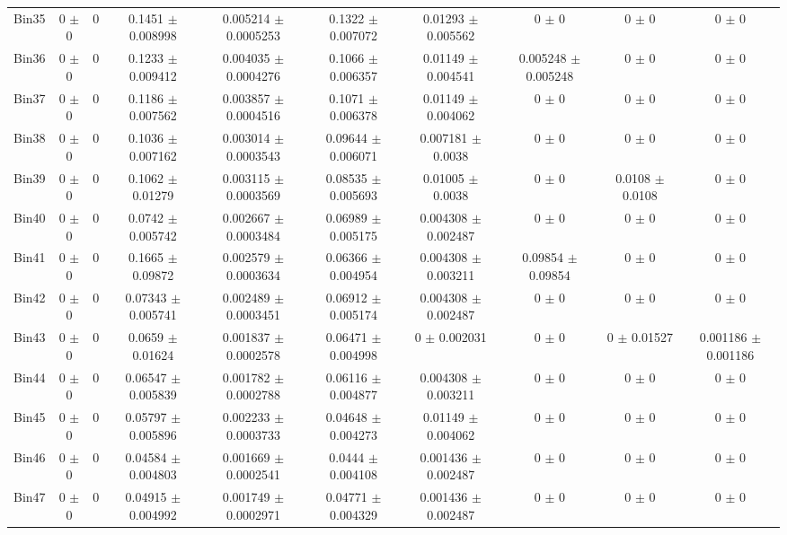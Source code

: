 \begin{tabular}{@{\extracolsep{4pt}}lccccccccc@{}}
     Bin35 & 0 $\pm$ 0 & 0 & 0.1451 $\pm$ 0.008998 & 0.005214 $\pm$ 0.0005253 & 0.1322 $\pm$ 0.007072 & 0.01293 $\pm$ 0.005562 & 0 $\pm$ 0 & 0 $\pm$ 0 & 0 $\pm$ 0 \\ 
     Bin36 & 0 $\pm$ 0 & 0 & 0.1233 $\pm$ 0.009412 & 0.004035 $\pm$ 0.0004276 & 0.1066 $\pm$ 0.006357 & 0.01149 $\pm$ 0.004541 & 0.005248 $\pm$ 0.005248 & 0 $\pm$ 0 & 0 $\pm$ 0 \\ 
     Bin37 & 0 $\pm$ 0 & 0 & 0.1186 $\pm$ 0.007562 & 0.003857 $\pm$ 0.0004516 & 0.1071 $\pm$ 0.006378 & 0.01149 $\pm$ 0.004062 & 0 $\pm$ 0 & 0 $\pm$ 0 & 0 $\pm$ 0 \\ 
     Bin38 & 0 $\pm$ 0 & 0 & 0.1036 $\pm$ 0.007162 & 0.003014 $\pm$ 0.0003543 & 0.09644 $\pm$ 0.006071 & 0.007181 $\pm$ 0.0038 & 0 $\pm$ 0 & 0 $\pm$ 0 & 0 $\pm$ 0 \\ 
     Bin39 & 0 $\pm$ 0 & 0 & 0.1062 $\pm$ 0.01279 & 0.003115 $\pm$ 0.0003569 & 0.08535 $\pm$ 0.005693 & 0.01005 $\pm$ 0.0038 & 0 $\pm$ 0 & 0.0108 $\pm$ 0.0108 & 0 $\pm$ 0 \\ 
     Bin40 & 0 $\pm$ 0 & 0 & 0.0742 $\pm$ 0.005742 & 0.002667 $\pm$ 0.0003484 & 0.06989 $\pm$ 0.005175 & 0.004308 $\pm$ 0.002487 & 0 $\pm$ 0 & 0 $\pm$ 0 & 0 $\pm$ 0 \\ 
     Bin41 & 0 $\pm$ 0 & 0 & 0.1665 $\pm$ 0.09872 & 0.002579 $\pm$ 0.0003634 & 0.06366 $\pm$ 0.004954 & 0.004308 $\pm$ 0.003211 & 0.09854 $\pm$ 0.09854 & 0 $\pm$ 0 & 0 $\pm$ 0 \\ 
     Bin42 & 0 $\pm$ 0 & 0 & 0.07343 $\pm$ 0.005741 & 0.002489 $\pm$ 0.0003451 & 0.06912 $\pm$ 0.005174 & 0.004308 $\pm$ 0.002487 & 0 $\pm$ 0 & 0 $\pm$ 0 & 0 $\pm$ 0 \\ 
     Bin43 & 0 $\pm$ 0 & 0 & 0.0659 $\pm$ 0.01624 & 0.001837 $\pm$ 0.0002578 & 0.06471 $\pm$ 0.004998 & 0 $\pm$ 0.002031 & 0 $\pm$ 0 & 0 $\pm$ 0.01527 & 0.001186 $\pm$ 0.001186 \\ 
     Bin44 & 0 $\pm$ 0 & 0 & 0.06547 $\pm$ 0.005839 & 0.001782 $\pm$ 0.0002788 & 0.06116 $\pm$ 0.004877 & 0.004308 $\pm$ 0.003211 & 0 $\pm$ 0 & 0 $\pm$ 0 & 0 $\pm$ 0 \\ 
     Bin45 & 0 $\pm$ 0 & 0 & 0.05797 $\pm$ 0.005896 & 0.002233 $\pm$ 0.0003733 & 0.04648 $\pm$ 0.004273 & 0.01149 $\pm$ 0.004062 & 0 $\pm$ 0 & 0 $\pm$ 0 & 0 $\pm$ 0 \\ 
     Bin46 & 0 $\pm$ 0 & 0 & 0.04584 $\pm$ 0.004803 & 0.001669 $\pm$ 0.0002541 & 0.0444 $\pm$ 0.004108 & 0.001436 $\pm$ 0.002487 & 0 $\pm$ 0 & 0 $\pm$ 0 & 0 $\pm$ 0 \\ 
     Bin47 & 0 $\pm$ 0 & 0 & 0.04915 $\pm$ 0.004992 & 0.001749 $\pm$ 0.0002971 & 0.04771 $\pm$ 0.004329 & 0.001436 $\pm$ 0.002487 & 0 $\pm$ 0 & 0 $\pm$ 0 & 0 $\pm$ 0 \\ 

\end{tabular}
